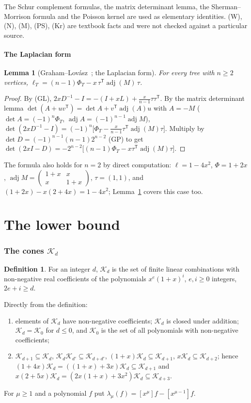 \documentclass[11pt]{amsart}
\newtheorem{lemma}[theorem]{Lemma}
\theoremstyle{definition}
\newtheorem{definition}[theorem]{Definition}
\theoremstyle{remark}
\newcommand{\adj}{\operatorname{adj}}
\newcommand{\K}{\mathcal K}
\newcommand{\T}{\mathsf T}
\begin{document}
The Schur complement formulas, the matrix determinant lemma, the
Sherman--Morrison formula and the Poisson kernel are used as elementary
identities. (W), (N), (M), (PS), (Kr) are textbook facts and were not checked
against a particular source.

\subsection{The Laplacian form}

\begin{lemma}[{Graham--Lov\'asz~\cite{GL78}; the Laplacian form}]\label{lem:L1}
For every tree with $n\ge2$ vertices,
$\ell_T=(n-1)\Phi_T-x\,\tau^\T\adj(M)\,\tau$.
\end{lemma}

\begin{proof}
By (GL), $2xD^{-1}-I=-(I+xL)+\frac{x}{n-1}\tau\tau^\T$. By the matrix
determinant lemma $\det(A+uv^\T)=\det A+v^\T\adj(A)u$ with $A=-M$
($\det A=(-1)^n\Phi_T$, $\adj A=(-1)^{n-1}\adj M$),
$\det(2xD^{-1}-I)=(-1)^n\bigl[\Phi_T-\frac{x}{n-1}\tau^\T\adj(M)\tau\bigr]$.
Multiply by $\det D=(-1)^{n-1}(n-1)2^{n-2}$ (GP) to get
$\det(2xI-D)=-2^{n-2}\bigl[(n-1)\Phi_T-x\tau^\T\adj(M)\tau\bigr]$.
\end{proof}

The formula also holds for $n=2$ by direct computation:
$\ell=1-4x^2$, $\Phi=1+2x$, $\adj M=\left(\begin{smallmatrix}1+x&x\\x&1+x\end{smallmatrix}\right)$,
$\tau=(1,1)$, and $(1+2x)-x(2+4x)=1-4x^2$; Lemma~\ref{lem:L1} covers this
case too.

\part*{The lower bound}

\section{The cones \texorpdfstring{$\K_d$}{K\_d}}\label{sec:cones}

\begin{definition}
For an integer $d$, $\K_d$ is the set of finite linear combinations with
non-negative real coefficients of the polynomials $x^e(1+x)^i$, $e,i\ge0$
integers, $2e+i\ge d$.
\end{definition}

Directly from the definition:
\begin{enumerate}
\item[(K1)] elements of $\K_d$ have non-negative coefficients; $\K_d$ is closed
under addition; $\K_d=\K_0$ for $d\le0$, and $\K_0$ is the set of all
polynomials with non-negative coefficients;
\item[(K2)] $\K_{d+1}\subseteq\K_d$, $\K_d\K_{d'}\subseteq\K_{d+d'}$,
$(1+x)\K_d\subseteq\K_{d+1}$, $x\K_d\subseteq\K_{d+2}$; hence
$(1+4x)\K_d=((1+x)+3x)\K_d\subseteq\K_{d+1}$ and
$x(2+5x)\K_d=(2x(1+x)+3x^2)\K_d\subseteq\K_{d+3}$.
\end{enumerate}
For $\mu\ge1$ and a polynomial $f$ put $\lambda_\mu(f)=[x^\mu]f-[x^{\mu-1}]f$.
\end{document}
